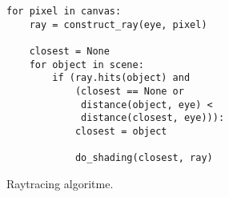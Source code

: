 \begin{listing}[tb]
\begin{verbatim}
for pixel in canvas:
    ray = construct_ray(eye, pixel)
    
    closest = None
    for object in scene:
        if (ray.hits(object) and 
            (closest == None or
             distance(object, eye) <
             distance(closest, eye))):
            closest = object
    
            do_shading(closest, ray)
  \end{verbatim}
  \caption{Raytracing algoritme.}
  \label{lst:rt-alg}
\end{listing}
